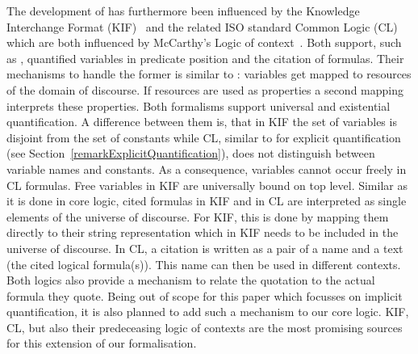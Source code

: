 The development of \nthreelogic has furthermore been influenced by the Knowledge Interchange Format (KIF)~\cite{kif} and the related ISO standard Common Logic (CL)~\cite{ICL}
which are both influenced by McCarthy's Logic of context~\cite{mccarthy}. 
Both support,
such as \nthree, quantified variables in predicate position and the citation of formulas. Their mechanisms to handle the former is similar to \rdf: 
variables get mapped to resources of the domain of discourse. If resources are used as properties a second mapping interprets these properties. Both formalisms support universal and
existential quantification. A difference between them is, that in KIF the set of variables is disjoint from the set of constants 
while CL, similar to \nthree for explicit 
quantification (see Section~\ref{remarkExplicitQuantification}), does not distinguish between variable names and constants. As a consequence, variables cannot occur freely
in CL formulas. Free variables in KIF are universally bound on top level.
%
Similar as it is done in core logic, cited formulas in KIF and in CL are interpreted as single elements of the universe of discourse. 
For KIF, this is done by mapping them directly to their string representation which in KIF needs to be included in the universe of discourse. In CL, a citation
is written as a pair of a name and a text (the cited logical formula(s)). This name can then be used in different contexts.  %
Both logics also provide a mechanism to relate the quotation to the actual formula they quote. Being out of scope for this paper which focusses 
on implicit quantification, it is also planned to add such a mechanism to our core logic. KIF, CL, but also their predeceasing logic of contexts are the most promising sources 
for this extension of our formalisation.


